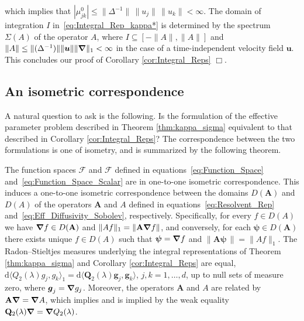 \documentclass[leqno,onefignum,onetabnum]{siamltex1213}
\renewcommand{\d}{\mathrm{d}}
\newcommand{\Ab}{\mathbf{A}}
\newcommand{\Qb}{\mathbf{Q}}
\newcommand{\Fc}{\mathcal{F}}
\newcommand{\Fs}{\mathscr{F}}
\newcommand\bnabla{\mbox{\boldmath${\nabla}$}}
\newcommand{\vecg}{\boldsymbol{g}}
\newcommand{\vecu}{\boldsymbol{u}}
\newcommand{\vecpsi}{\boldsymbol{\psi}}
\begin{document}
%
which implies that
$|\mu^0_{jk}|\leq\|\Delta^{-1}\|\,\|u_j\|\,\|u_k\|<\infty$.  The
domain of integration $I$ in~\eqref{eq:Integral_Rep_kappa*} is
determined by the spectrum $\Sigma(A)$ of the operator $A$, where
$I\subseteq[-\|A\|,\|A\|]$ and $\|A\|\leq\|(\Delta^{-1})\|\|\vecu \|\|\bnabla \|_1<\infty$ in the case of a
time-independent velocity field $\vecu $. This concludes our proof of
Corollary \ref{cor:Integral_Reps} $\Box$.  



\subsection{An isometric
  correspondence} \label{sec:Isometric_Correspondence} 
%
A natural question to ask is the following. Is the formulation of the
effective parameter problem described in Theorem \ref{thm:kappa_sigma}
equivalent to that described in Corollary \ref{cor:Integral_Reps}?
The correspondence between the two formulations is one of isometry,
and is summarized by the following theorem. 
%
\begin{theorem}\label{thm:Formulation_Equivalence}
%  
The function spaces $\Fc$ and $\Fs$ defined in
equations~\eqref{eq:Function_Space}
and~\eqref{eq:Function_Space_Scalar} are in one-to-one isometric
correspondence. This induces a one-to-one 
isometric correspondence between the domains $D(\Ab)$ and $D(A)$ of
the operators $\Ab$ and $A$ defined in
equations~\eqref{eq:Resolvent_Rep}
and~\eqref{eq:Eff_Diffusivity_Sobolev}, 
respectively. Specifically, for every $f\in D(A)$ we have
$\bnabla f\in D(\Ab)$ and $\|Af\|_1=\|\Ab\bnabla f\|$, and conversely, for each
$\vecpsi\in D(\Ab)$ there exists unique $f\in D(A)$ such that
$\vecpsi=\bnabla f$  and $\|\Ab\vecpsi\,\|=\|Af\|_1$. The Radon--Stieltjes
measures underlying the integral representations of Theorem
\ref{thm:kappa_sigma} and Corollary \ref{cor:Integral_Reps} are equal,
$\d\langle Q_2(\lambda)g_j,g_k\rangle_1=\d\langle\Qb_2(\lambda)\vecg_j,\vecg_k\rangle$, $j,k=1,\ldots,d$,
up to null sets of measure zero, where
$\vecg_j=\bnabla g_j$. Moreover, the operators $\Ab$ and $A$ are
related by $\Ab\bnabla =\bnabla A$, which implies and is implied by the
weak equality $\Qb_2(\lambda)\bnabla =\bnabla Q_2(\lambda)$.
%
\end{theorem}
%
\end{document}
